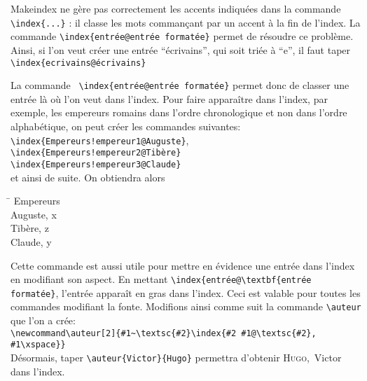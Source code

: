 Makeindex ne gère pas correctement les accents indiquées dans la commande \verb+\index{...}+ : il classe les mots commançant par un accent à la fin de l'index. La commande \verb+\index{entrée@entrée formatée}+ permet de résoudre ce problème. Ainsi, si l'on veut créer une entrée \enquote{écrivains}, qui soit triée à \enquote{e}, il faut taper \verb+\index{ecrivains@écrivains}+

La commande \verb+ \index{entrée@entrée formatée}+ permet donc de classer une entrée là où l'on veut dans l'index. Pour faire apparaître dans l'index, par exemple, les empereurs romains dans l'ordre chronologique et non dans l'ordre alphabétique, on peut créer les commandes suivantes:\\
\verb+\index{Empereurs!empereur1@Auguste}+,\\ \verb+\index{Empereurs!empereur2@Tibère}+\\
\verb+\index{Empereurs!empereur3@Claude}+\\
et ainsi de suite. On obtiendra alors
\begin{tabbing}
\hspace{0,5cm} \= \kill
Empereurs\\
\> Auguste, x\\
\> Tibère, z\\
\> Claude, y \\

\end{tabbing}

Cette commande est aussi utile pour mettre en évidence une entrée dans l'index en modifiant son aspect. En mettant \verb+\index{entrée@\textbf{entrée formatée}+, l'entrée apparaît en gras dans l'index. Ceci est valable pour toutes les commandes modifiant la fonte. Modifions ainsi comme suit la commande \verb+\auteur+ que l'on a crée:\\
\verb+\newcommand\auteur[2]{#1~\textsc{#2}\index{#2 #1@\textsc{#2}, #1\xspace}}+\\
Désormais, taper \verb|\auteur{Victor}{Hugo}| permettra d'obtenir \textsc{Hugo},~Victor dans l'index.
 
 
 
